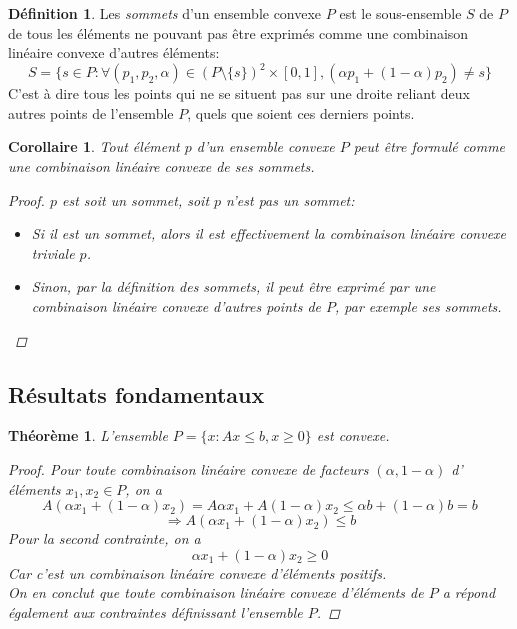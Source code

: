 \documentclass[a4paper]{report}
\theoremstyle{definition}
\newtheorem*{definition}{Définition}
\theoremstyle{remark}
\theoremstyle{plain}
\newtheorem{theorem}{Théorème}
\newtheorem{corollary}{Corollaire}
\begin{document}
\begin{definition}
Les \emph{sommets} d'un ensemble convexe \(P\) est le sous-ensemble \(S\) de
\(P\) de tous les éléments ne pouvant pas être exprimés comme une combinaison
linéaire convexe d'autres éléments:
\[S=\{s\in P:\forall (p_1,p_2,\alpha)\in (P\setminus\{s\})^2\times[0,1],(\alpha
p_1+(1-\alpha)p_2)\neq s\}\] C'est à dire tous les points qui ne se situent pas
sur une droite reliant deux autres points de l'ensemble \(P\), quels que soient
ces derniers points.
\end{definition}

\begin{corollary}
Tout élément \(p\) d'un ensemble convexe \(P\) peut être formulé comme une
combinaison linéaire convexe de ses sommets.
\begin{proof}
\(p\) est soit un sommet, soit \(p\) n'est pas un sommet:
\begin{itemize}
	\item Si il est un sommet, alors il est effectivement la combinaison
	linéaire convexe triviale \(p\).
	\item Sinon, par la définition des sommets, il peut être exprimé par
	une combinaison linéaire convexe d'autres points de \(P\), par exemple ses
	sommets.
\end{itemize}
\end{proof}
\end{corollary}

\subsection{Résultats fondamentaux}
\begin{theorem}
\label{P is convex}
L'ensemble \(P = \{x:Ax\le b,x\ge 0\}\) est convexe.
\begin{proof}
Pour toute combinaison linéaire convexe de facteurs \((\alpha, 1-\alpha)\)
d' éléments \(x_1,x_2 \in P\), on a
\[A(\alpha x_1+(1-\alpha)x_2) = A\alpha x_1 + A(1-\alpha)x_2
\le \alpha b + (1-\alpha) b = b\]
\[\Rightarrow A(\alpha x_1+(1-\alpha)x_2) \le b\]
Pour la second contrainte, on a
\[\alpha x_1+(1-\alpha)x_2\ge 0\]
Car c'est un combinaison linéaire convexe d'éléments positifs.\\
On en conclut que toute combinaison linéaire convexe d'éléments de \(P\) a
répond également aux contraintes définissant l'ensemble \(P\).

\end{proof}
\end{theorem}
\end{document}
